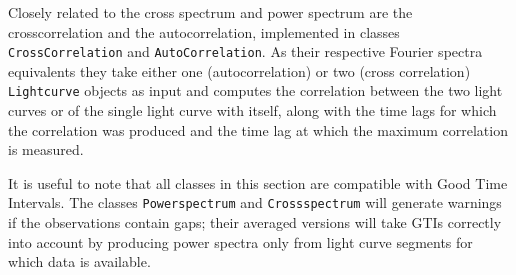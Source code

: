 \documentclass[twocolumn]{aastex62}
\newcommand{\stingray}{\texttt{stingray}\xspace}
\newcommand{\lightcurve}{\texttt{Lightcurve}\xspace}
\newcommand{\crossspectrum}{\texttt{Crossspectrum}\xspace}
\newcommand{\powerspectrum}{\texttt{Powerspectrum}\xspace}
\begin{document}
Closely related to the cross spectrum and power spectrum are the crosscorrelation and the autocorrelation, implemented in classes \texttt{CrossCorrelation} and \texttt{AutoCorrelation}. As their respective Fourier spectra equivalents they take either one (autocorrelation) or two (cross correlation) \lightcurve objects as input and computes the correlation between the two light curves or of the single light curve with itself, along with the time lags for which the correlation was produced and the time lag at which the maximum correlation is measured.

It is useful to note that all classes in this section are compatible with Good Time Intervals. The classes \powerspectrum and \crossspectrum will generate warnings if the observations contain gaps; their averaged versions will take GTIs correctly into account by producing power spectra only from light curve segments for which data is available. 






\end{document}
